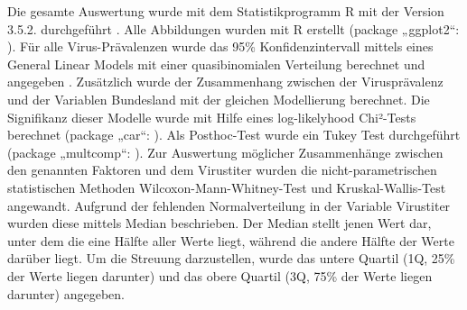 Die gesamte Auswertung wurde mit dem Statistikprogramm R mit der Version 3.5.2. durchgeführt \citep{rcoreteam2020}. Alle Abbildungen wurden mit R erstellt (package „ggplot2“: \citep{wickham2016}).
Für alle Virus-Prävalenzen wurde das 95\% Konfidenzintervall mittels eines General Linear Models mit einer quasibinomialen Verteilung berechnet und angegeben \citep{vanderzee2013}. Zusätzlich wurde der Zusammenhang zwischen der Virusprävalenz und der Variablen Bundesland mit der gleichen Modellierung berechnet. Die Signifikanz dieser Modelle wurde mit Hilfe eines log-likelyhood Chi²-Tests berechnet (package „car“: \citep{fox2011}).  Als Posthoc-Test wurde ein Tukey Test durchgeführt (package „multcomp“: \citep{hothorn2008}). 
Zur Auswertung möglicher Zusammenhänge zwischen den genannten Faktoren und dem Virustiter wurden die nicht-parametrischen statistischen Methoden Wilcoxon-Mann-Whitney-Test und Kruskal-Wallis-Test angewandt. Aufgrund der fehlenden Normalverteilung in der Variable Virustiter wurden diese mittels Median beschrieben. Der Median stellt jenen Wert dar, unter dem die eine Hälfte aller Werte liegt, während die andere Hälfte der Werte darüber liegt. Um die Streuung darzustellen, wurde das untere Quartil (1Q, 25\% der Werte liegen darunter) und das obere Quartil (3Q, 75\% der Werte liegen darunter) angegeben.
